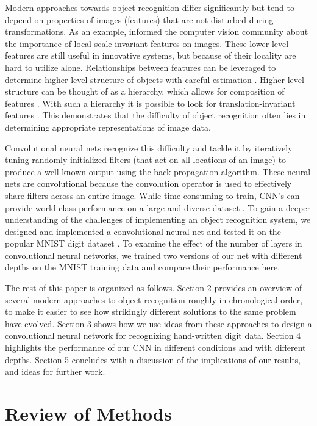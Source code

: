 \documentclass[10pt,twocolumn,letterpaper]{article}
\begin{document}
Modern approaches towards object recognition differ significantly but tend to depend on
properties of images (features) that are not disturbed during transformations.
As an example, \cite{LoweObjSIFT} informed the computer vision community about the importance of
local scale-invariant features on images.
These lower-level features are still useful in innovative systems, but because of their
locality are hard to utilize alone.
Relationships between features can be leveraged to determine higher-level structure of
objects with careful estimation \cite{PartModels}.
Higher-level structure can be thought of as a hierarchy, which allows for composition of features
\cite{HintonDBN}.
With such a hierarchy it is possible to look for translation-invariant features \cite{CDBN}.
This demonstrates that the difficulty of object recognition often lies in determining
appropriate representations of image data.

Convolutional neural nets recognize this difficulty and tackle it by iteratively tuning randomly
initialized filters (that act on all locations of an image) to produce a well-known output using
the back-propagation algorithm. These neural nets are convolutional because the convolution operator
is used to effectively share filters across an entire image. While time-consuming to train, CNN's
can provide world-class performance on a large and diverse dataset \cite{ImageNet}.
To gain a deeper understanding of the challenges of implementing an object recognition system,
we designed and implemented a convolutional neural net and tested it on the popular MNIST
digit dataset \cite{MNIST}.
To examine the effect of the number of layers in convolutional neural networks,
we trained two versions of our net with different depths on the MNIST training data
and compare their performance here.

The rest of this paper is organized as follows.
Section 2 provides an overview of several modern approaches to object recognition
roughly in chronological order, to make it easier to see how strikingly different
solutions to the same problem have evolved.
Section 3 shows how we use ideas from these approaches to design
a convolutional neural network for recognizing hand-written digit data.
Section 4 highlights the performance of our CNN in different conditions and with different depths.
Section 5 concludes with a discussion of the implications of our results, and ideas for
further work.

\section{Review of Methods}
\end{document}
